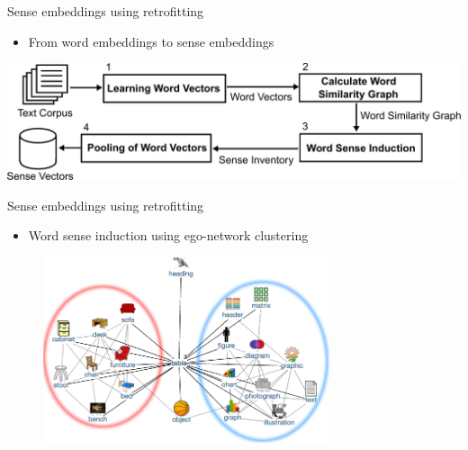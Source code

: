 \begin{frame}{Sense embeddings using retrofitting}
\begin{itemize}
\item From word embeddings to sense embeddings
\end{itemize}
\includegraphics[width=\textwidth]{pipeline-sensegram}

\end{frame}



\begin{frame}{Sense embeddings using retrofitting}

\begin{itemize}
\item Word sense induction using  ego-network clustering
\end{itemize} 
	
\centering
\begin{figure}
\includegraphics[width=0.75\textwidth]{table}
\end{figure}

\end{frame}


